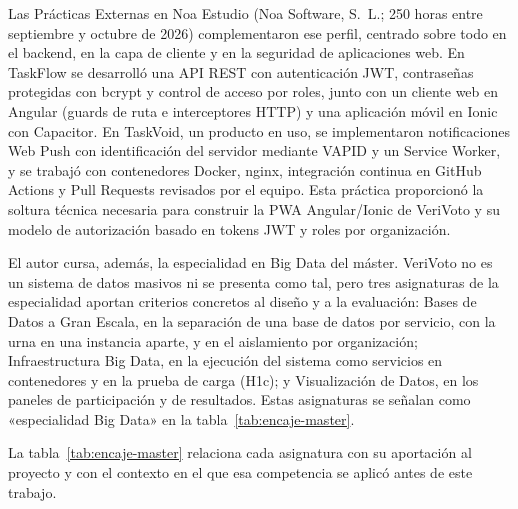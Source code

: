 Las Prácticas Externas en Noa Estudio (Noa Software, S.~L.; 250 horas entre
septiembre y octubre de 2026) complementaron ese perfil, centrado sobre todo en
el backend, en la capa de cliente y en la seguridad de aplicaciones web. En
TaskFlow se desarrolló una API REST con autenticación JWT, contraseñas
protegidas con bcrypt y control de acceso por roles, junto con un cliente web
en Angular (guards de ruta e interceptores HTTP) y una aplicación móvil en
Ionic con Capacitor. En TaskVoid, un producto en uso, se implementaron
notificaciones Web Push con identificación del servidor mediante VAPID y un
Service Worker, y se trabajó con contenedores Docker, nginx, integración
continua en GitHub Actions y Pull Requests revisados por el equipo. Esta
práctica proporcionó la soltura técnica necesaria para construir la PWA
Angular/Ionic de VeriVoto y su modelo de autorización basado en tokens JWT y
roles por organización.

El autor cursa, además, la especialidad en Big Data del máster. VeriVoto no
es un sistema de datos masivos ni se presenta como tal, pero tres asignaturas
de la especialidad aportan criterios concretos al diseño y a la evaluación:
Bases de Datos a Gran Escala, en la separación de una base de datos por
servicio, con la urna en una instancia aparte, y en el aislamiento por
organización; Infraestructura Big Data, en la ejecución del sistema como
servicios en contenedores y en la prueba de carga (H1c); y Visualización de
Datos, en los paneles de participación y de resultados. Estas asignaturas se
señalan como «especialidad Big Data» en la tabla~\ref{tab:encaje-master}.

La tabla~\ref{tab:encaje-master} relaciona cada asignatura con su aportación
al proyecto y con el contexto en el que esa competencia se aplicó antes de
este trabajo.

